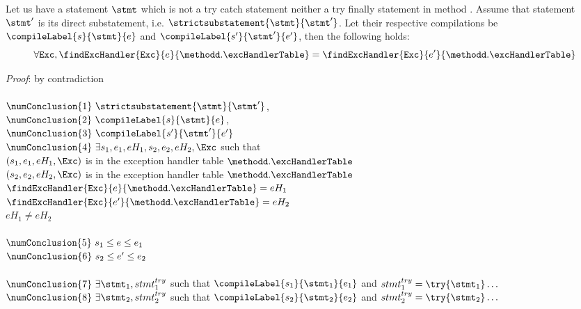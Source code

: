 \begin{compProp8A}
  Let us have a statement $\stmt$ which is not a try catch statement  neither a try finally statement in method \methodd. Assume that 
  statement $\stmt'$ is its direct substatement, i.e. 
$\strictsubstatement{\stmt}{\stmt'} $. Let 
 their respective compilations be  $\compileLabel{s}{\stmt}{e}$ and  $\compileLabel{s'}{\stmt'}{e'}$, then the following holds:
$$   \forall \mbox{\rm\tt{Exc}}, 
	  \findExcHandler{\mbox{\rm\tt{Exc}} }{e}{\methodd.\excHandlerTable} = \findExcHandler{\mbox{\rm\tt{Exc}} }{e'}{\methodd.\excHandlerTable} $$
\end{compProp8A}
\textit{Proof}: by contradiction \\
 \\
$\numConclusion{1} \ \strictsubstatement{\stmt}{\stmt'}   $, \\
$\numConclusion{2} \ \compileLabel{s}{\stmt}{e}$,\\
$\numConclusion{3} \ \compileLabel{s'}{\stmt'}{e'}$ \\
$\numConclusion{4} \ \exists s_1, e_1, eH_1, s_2, e_2, eH_2, \Exc $ such that\\
   $ (s_1,e_1, eH_1, \Exc )$ is in the exception handler table $\methodd.\excHandlerTable$\\
   $ (s_2,e_2, eH_2, \Exc )$ is in the exception handler table $\methodd.\excHandlerTable$\\
   $\findExcHandler{\mbox{\rm\tt{Exc}} }{e}{\methodd.\excHandlerTable} = eH_1$  \\
   $\findExcHandler{\mbox{\rm\tt{Exc}} }{e'}{\methodd.\excHandlerTable} = eH_2$  \\
   $ eH_1 \neq  eH_2  $ \\
 \\
$\numConclusion{5} \  s_1 \le e \le e_1$ \\
$\numConclusion{6} \  s_2 \le e' \le e_2$ \\
 \\
$\numConclusion{7} \ \exists \stmt_1, stmt^{try}_1 $ such that $  \compileLabel{s_1}{\stmt_1}{e_1}$ and $  stmt^{try}_1 = \try\{ \stmt_1\} \ldots $ \\
$\numConclusion{8} \ \exists \stmt_2,stmt^{try}_2$ such that $ \compileLabel{s_2}{\stmt_2}{e_2} $ and $ stmt^{try}_2 = \try\{ \stmt_2\} \ldots $ \\
